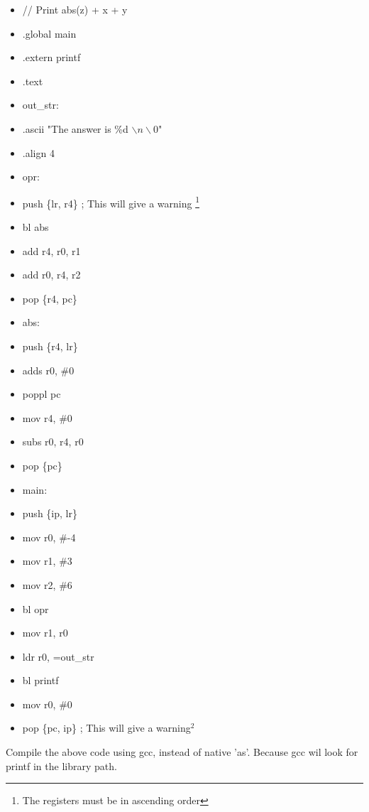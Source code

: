 \documentclass{article}
\begin{document}
	\begin{itemize}
	\item[] // Print abs(z) + x + y
	\item[] .global main
	\item[] \qquad .extern printf
	
	\item[] .text
	\item[] out\_str:
	\item[] \qquad .ascii "The answer is \%d $\backslash n \backslash 0$"	
	\item[] .align 4
	\item[] opr:
	\item[] \qquad push \{lr, r4\} \qquad ; This will give a warning \footnote{The registers must be in ascending order}
	\item[] \qquad bl abs
	\item[] \qquad add r4, r0, r1
	\item[] \qquad add r0, r4, r2
	\item[] \qquad pop \{r4, pc\}
	\item[] abs:
	\item[] \qquad push \{r4, lr\}
	\item[] \qquad adds r0, \#0
	\item[] \qquad poppl {pc}
	\item[] \qquad mov r4, \#0
	\item[] \qquad subs r0, r4, r0
	\item[] \qquad pop \{pc\}
	
	\item[] main:
	\item[] \qquad push \{ip, lr\}
	\item[] \qquad mov r0, \#-4
	\item[] \qquad mov r1, \#3
	\item[] \qquad mov r2, \#6
	\item[] \qquad bl opr
	\item[] \qquad mov r1, r0
	\item[] \qquad ldr r0, =out\_str
	\item[] \qquad bl printf
	\item[] \qquad mov r0, \#0
	\item[] \qquad pop \{pc, ip\} \qquad ; This will give a warning$^2$
	\end{itemize}
	Compile the above code using gcc, instead of native 'as'. Because gcc wil look for printf in the library path.
\end{document}
